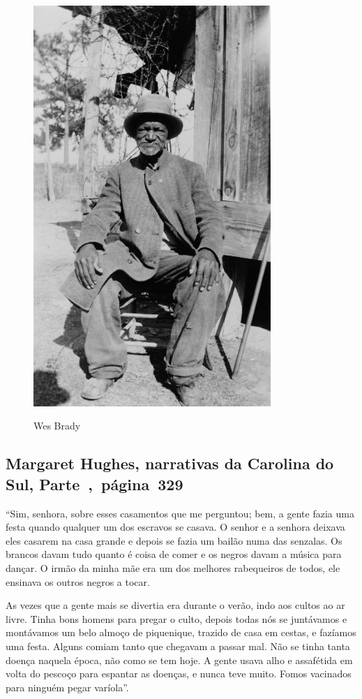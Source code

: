 \begin{figure}[]
\centering
 \includegraphics[width=90mm]{./imgs/wesbrady_recorte.jpg} \label{img15}
\caption{Wes Brady}
\end{figure}

\subsection{Margaret Hughes, narrativas da Carolina do Sul, Parte~,~página~329}
\label{ref154}

``Sim, senhora, sobre esses casamentos que me perguntou; bem, a gente
fazia uma festa quando qualquer um dos escravos se casava. O senhor e a
senhora deixava eles casarem na casa grande e depois se fazia um bailão
numa das senzalas. Os brancos davam tudo quanto é coisa de comer e os
negros davam a música para dançar. O irmão da minha mãe era um dos
melhores rabequeiros de todos, ele ensinava os outros negros a tocar.

As vezes que a gente mais se divertia era durante o verão, indo aos
cultos ao ar livre. Tinha bons homens para pregar o culto, depois todas
nós se juntávamos e montávamos um belo almoço de piquenique, trazido de
casa em cestas, e fazíamos uma festa. Alguns comiam tanto que chegavam a
passar mal. Não se tinha tanta doença naquela época, não como se tem
hoje. A gente usava alho e assafétida em volta do pescoço para espantar
as doenças, e nunca teve muito. Fomos vacinados para ninguém pegar
varíola''.

